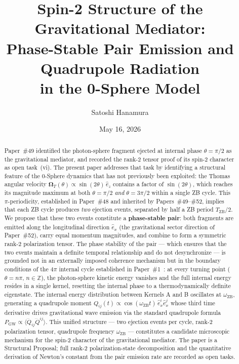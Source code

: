 \documentclass[%
 reprint, amsmath,amssymb, aps, prb, ]{revtex4-2}
\numberwithin{equation}{section}
\newcommand{\iphase}{\theta}
\newcommand{\omZB}{\omega_{\text{ZB}}}
\newcommand{\OmT}{\boldsymbol{\Omega}_T}
\newcommand{\ehat}[1]{\hat{e}_{#1}}
\begin{document}

\title{Spin-2 Structure of the Gravitational Mediator:\\
Phase-Stable Pair Emission and Quadrupole Radiation\\
in the 0-Sphere Model}

\author{Satoshi Hanamura}
\date{May 16, 2026}

\begin{abstract}
Paper~\#49 identified the photon-sphere fragment ejected at internal phase $\iphase = \pi/2$ as the gravitational mediator, and recorded the rank-2 tensor proof of its spin-2 character as open task~(vi).
The present paper addresses that task by identifying a structural feature of the 0-Sphere dynamics that has not previously been exploited: the Thomas angular velocity $\OmT(\iphase) \propto \sin(2\iphase)\,\ehat{z}$ contains a factor of $\sin(2\iphase)$, which reaches its magnitude maximum at both $\iphase = \pi/2$ \emph{and} $\iphase = 3\pi/2$ within a single ZB cycle.
This $\pi$-periodicity, established in Paper~\#48 and inherited by Papers~\#49--\#52, implies that each ZB cycle produces \emph{two} ejection events, separated by half a ZB period $T_\mathrm{ZB}/2$.
We propose that these two events constitute a \textbf{phase-stable pair}: both fragments are emitted along the longitudinal direction $\ehat{x}$ (the gravitational sector direction of Paper~\#52), carry equal momentum magnitudes, and combine to form a symmetric rank-2 polarization tensor.
The phase stability of the pair --- which ensures that the two events maintain a definite temporal relationship and do not desynchronize --- is grounded not in an externally imposed coherence mechanism but in the boundary conditions of the $4\pi$ internal cycle established in Paper~\#1~\cite{hanamura01}: at every turning point ($\iphase = n\pi$, $n \in \mathbb{Z}$), the photon-sphere kinetic energy vanishes and the full internal energy resides in a single kernel, resetting the internal phase to a thermodynamically definite eigenstate.
The internal energy distribution between Kernels A and B oscillates at $\omZB$, generating a quadrupole moment $Q_{ij}(t) \propto \cos(\omZB t)\,\ehat{x}^i\ehat{x}^j$ whose third time derivative drives gravitational wave emission via the standard quadrupole formula $P_\mathrm{GW} \propto \langle\dddot{Q}_{ij}\dddot{Q}^{ij}\rangle$.
This unified structure --- two ejection events per cycle, rank-2 polarization tensor, quadrupole frequency $\omZB$ --- constitutes a candidate microscopic mechanism for the spin-2 character of the gravitational mediator.
The paper is a Structural Proposal; full rank-2 polarization-state decomposition and the quantitative derivation of Newton's constant from the pair emission rate are recorded as open tasks.
\end{abstract}
\end{document}
